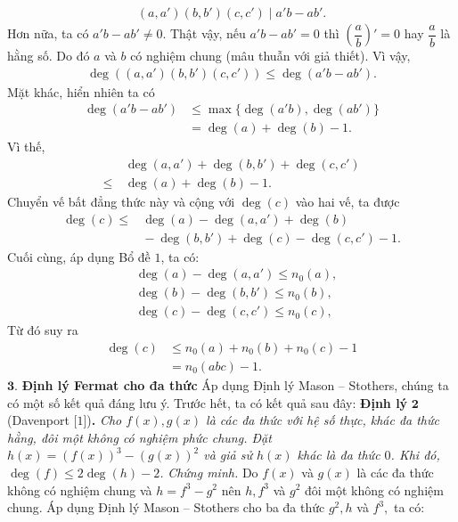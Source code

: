 \begin{multicols}{2}
\begin{align*}
		(a,a')(b,b')(c,c') \mid a'b - ab'.
	\end{align*}
	Hơn nữa, ta có $a'b - ab'\ne 0$. Thật vậy, nếu $ a'b - ab'= 0$ thì $\left(\dfrac{a}{b}\right)'=0$ hay $\dfrac{a}{b}$ là hằng số. Do đó $a$ và $b$ có nghiệm chung (mâu thuẫn với giả thiết).
	Vì vậy, 
	\begin{align*}
		\deg ((a,a')(b,b')(c,c'))\leq \deg(a'b - ab').
	\end{align*} 
	Mặt khác, hiển nhiên ta có 
	\begin{align*}
		\deg(a'b-ab')&\leq \max\{\deg(a'b),\deg(ab')\}\\
			&=\deg(a)+\deg(b)-1.
	\end{align*}
	Vì thế,
	\begin{align*}
		&\deg(a,a') + \deg(b,b') + \deg(c,c') \\
		\leq \,&\deg(a) + \deg(b) - 1.
	\end{align*}
	Chuyển vế bất đẳng thức này và cộng với $\deg (c)$ vào hai vế, ta được 
	\begin{align*}
		\deg(c) \leq& \deg(a) - \deg(a,a') + \deg(b) \\
		&\!\!\!-\! \deg(b,b') \!+\! \deg(c) \!-\! \deg(c,c')\!-\!1.
	\end{align*} 
	Cuối cùng, áp dụng Bổ đề $1$, ta có:
	\begin{align*}
		&\deg(a) - \deg(a,a') \leq n_0{(a)},\\
		&\deg(b) - \deg(b,b') \leq n_0{(b),}\\
		&\deg(c) - \deg(c,c') \leq n_0{(c)},
	\end{align*}
	Từ đó suy ra 
	\begin{align*}
		\deg(c) &\le n_0{(a)} + n_0{(b)} + n_0{(c)} - 1 \\
		&= n_0{(abc)} - 1.
	\end{align*}
	$\pmb{3.}$ \textbf{\color{hoccungpi}Định lý Fermat cho đa thức}
	\vskip 0.1cm
	Áp dụng Định lý Mason -- Stothers, chúng ta có một số kết quả đáng lưu ý. Trước hết, ta có kết quả sau đây:
	\vskip 0.1cm
	\textbf{\color{hoccungpi}Định lý} $\pmb{2}$  (Davenport [$1$])\textbf{\color{hoccungpi}.} \textit{Cho $f(x),g(x)$ là các đa thức với hệ số thực, khác đa thức hằng, đôi một không có nghiệm phức chung. Đặt $h(x)=(f(x))^3-(g(x))^2$ và giả sử $h(x)$ khác là đa thức $0$. Khi đó, $\deg (f) \leq 2\deg (h)-2$.}
	\vskip 0.1cm
	\textit{Chứng minh.}
	Do $f(x)$ và $g(x)$ là các đa thức không có nghiệm chung và $h = f^3 - g^2$ nên $h, f^3$ và $g^2$ đôi một không có nghiệm chung.  Áp dụng Định lý Mason -- Stothers cho ba đa thức $ g^2, h$ và $f^3,$ ta có:

\end{multicols}
